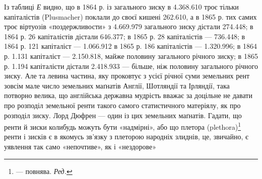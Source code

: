 Із таблиці \emph{Е} видно, що в 1864 р. із загального зиску в \num{4.368.610} троє тільки капіталістів (Plusmacher) поклали до
своєї кишені \num{262.610}, а в 1865 р. тих самих троє
віртуозів «поздержливости» з \num{4.669.979} загального
зиску дістали \num{274.448}; в 1864 р. 26 капіталістів
дістали \num{646.377}; в 1865 р. 28 капіталістів —
\num{736.448}; в 1864 р. 121 капіталіст — \num{1.066.912} в 1865 р. 186 капіталістів — \num{1.320.996}; в 1864 р. \num{1.131} капіталіст — \num{2.150.818},
майже половину загального річного зиску; в 1865 р.
\num{1.194} капіталісти дістали \num{2.418.933} — більше, ніж
половину загального річного зиску. Але та левина частина,
яку проковтує з усієї річної суми земельних рент зовсім мале
число земельних маґнатів Англії, Шотляндії та Ірляндії, така
потворно велика, що англійська державна мудрість вважає за
доцільне не давати про розподіл земельної ренти такого самого
статистичного матеріялу, як про розподіл зиску. Лорд Дюфрен
— один із цих земельних маґнатів. Гадати, що ренти й зиски
колибудь можуть бути «надмірні», або що плетора (plethora)\footnote*{
— повнява. \emph{Ред.}
}
ренти і зисків є в якомусь зв’язку з плеторою народніх злиднів,
це, звичайно, є уявлення так само «непочтиве», як і «нездорове»
\parbreak{}  %
